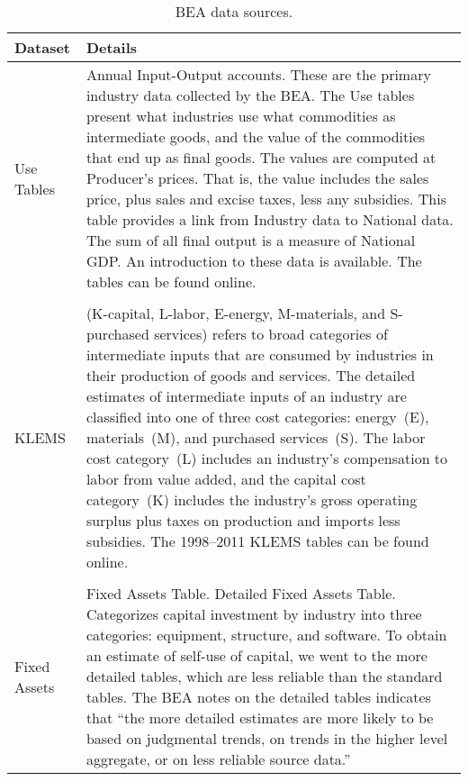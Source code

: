 \begin{table}
\caption[BEA data sources]{BEA data sources.}
\begin{center}
  \begin{tabular}{l @{\hspace{2em}} p{10cm}}
   \toprule 
    Dataset & Details  \\ 

	\midrule
Use Tables & Annual Input-Output accounts. 
	These are the primary industry data collected by the BEA\@.
	The Use tables present what industries use what commodities 
	as intermediate goods, and the value of the commodities that end up as final goods. 
	The values are computed at Producer’s prices. 
	That is, the value includes the sales price, plus sales and excise taxes, 
	less any subsidies. 
	This table provides a link from Industry data to National data. 
	The sum of all final output is a measure of National GDP\@.
	An introduction to these data is available.\cite{Streitwieser:2011aa}
	The tables can be found online.\cite{BEAIOData}\\
 &\\

KLEMS & (K-capital, L-labor, E-energy, M-materials, and S-purchased services) 
	refers to broad categories of intermediate inputs 
	that are consumed by industries in their production 
	of goods and services.\cite{Strassner:2005aa}
	The detailed estimates of intermediate inputs of an industry 
	are classified into one of three cost categories:
	energy~(E), materials~(M), and purchased services~(S).
	The labor cost category~(L) includes an industry’s compensation to labor from value added, 
	and the capital cost category~(K) includes the industry’s 
	gross operating surplus plus taxes on production and imports less subsidies.  
	The 1998--2011 KLEMS tables can be found online.\cite{BEAKLEMSData}\\
 & \\
Fixed Assets &  Fixed Assets Table. Detailed Fixed Assets Table. 
	Categorizes capital investment by industry into three categories:
	equipment, structure, and software. 
	To obtain an estimate of self-use of capital, 
	we went to the more detailed tables, 
	which are less reliable than the standard tables. 
	The BEA notes on the detailed tables indicates that 
	``the more detailed estimates are more likely to be based on judgmental trends, 
	on trends in the higher level aggregate, 
	or on less reliable source data.''~\cite[Table~2.5]{BEADetailedData}\\
    \bottomrule
  \end{tabular}

\end{center}
\label{tab:data_definitions}
\end{table}

